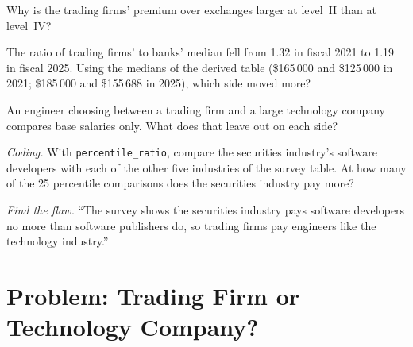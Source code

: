 \begin{exercise}[$\star\star$]\label{exo:in:software-engineer:4}
Why is the trading firms' premium over exchanges larger at level~II than at level~IV?
\end{exercise}

\begin{exercise}[$\star\star$]\label{exo:in:software-engineer:5}
The ratio of trading firms' to banks' median fell from 1.32 in fiscal 2021 to 1.19 in fiscal 2025. Using the medians of
the derived table (\$165\,000 and \$125\,000 in 2021; \$185\,000 and \$155\,688 in 2025), which side moved more?
\end{exercise}

\begin{exercise}[$\star\star$]\label{exo:in:software-engineer:6}
An engineer choosing between a trading firm and a large technology company compares base salaries only. What does that
leave out on each side?
\end{exercise}

\begin{exercise}[$\star\star\star$]\label{exo:in:software-engineer:7}
\emph{Coding.} With \texttt{percentile\_ratio}, compare the securities industry's software developers with each of the
other five industries of the survey table. At how many of the 25 percentile comparisons does the securities industry pay
more?
\end{exercise}

\begin{exercise}[$\star\star\star$]\label{exo:in:software-engineer:8}
\emph{Find the flaw.} ``The survey shows the securities industry pays software developers no more than software
publishers do, so trading firms pay engineers like the technology industry.''
\end{exercise}

\section{Problem: Trading Firm or Technology Company?}

